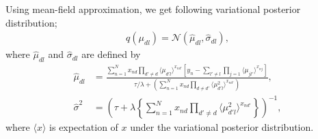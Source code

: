 \documentclass[12pt]{amsart}
\begin{document}
Using mean-field approximation, we get following variational posterior distribution; 
\begin{align*}
q(\mu_{dl})= \mathcal{N}(\hat \mu_{dl},\hat \sigma_{dl}), 
\end{align*}
where $\hat \mu_{dl}$ and $\hat \sigma_{dl}$ are defined by
\begin{align*}
\hat \mu_{dl} &=\frac{\sum_{n=1}^N x_{nd}\prod_{d' \neq d} \langle \mu_{d'l} \rangle ^{x_{nd'}} \left[y_n -\sum_{l'\neq l}\prod_{j=1}  \langle \mu_{jl'} \rangle ^{x_{nj}}  \right]}{\tau/\lambda + \left( \sum_{n=1}^N x_{nd}\prod_{d\neq d'} \langle \mu_{d'l}^{2} \rangle ^{x_{nd'}} \right)},\\
\hat \sigma^2 &=\left(\tau + \lambda \left\{\sum_{n=1}^N x_{nd}\prod_{d' \neq d}  \langle \mu_{d'l}^2 \rangle ^{x_{nd'}}\right\} \right)^{-1},
\end{align*}
where $\langle x \rangle$ is expectation of $x$ under the variational posterior distribution.
\end{document}
